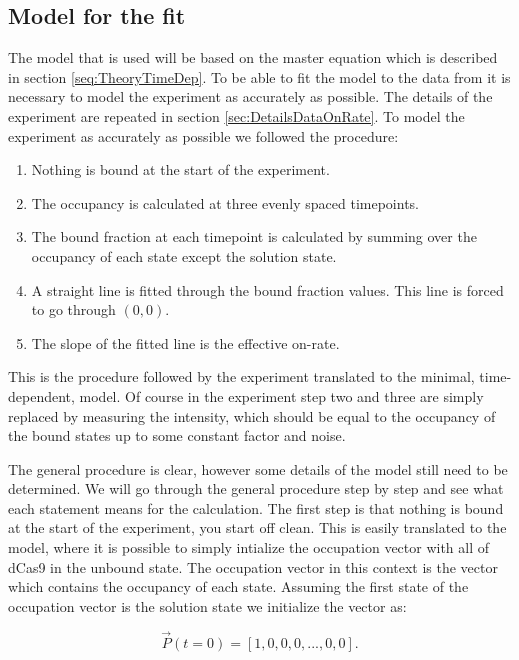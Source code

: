 \subsection{Model for the fit}
The model that is used will be based on the master equation which is described in section \ref{seq:TheoryTimeDep}. To be able to fit the model to the data from \cite{PNAS} it is necessary to model the experiment as accurately as possible. The details of the experiment are repeated in section \ref{sec:DetailsDataOnRate}. To model the experiment as accurately as possible we followed the procedure:

\begin{enumerate}
\item Nothing is bound at the start of the experiment.
\item The occupancy is calculated at three evenly spaced timepoints.
\item The bound fraction at each timepoint is calculated by summing over the occupancy of each state except the solution state.
\item A straight line is fitted through the bound fraction values. This line is forced to go through $(0,0)$.
\item The slope of the fitted line is the effective on-rate.
\end{enumerate}

This is the procedure followed by the experiment translated to the minimal, time-dependent, model. Of course in the experiment step two and three are simply replaced by measuring the intensity, which should be equal to the occupancy of the bound states up to some constant factor and noise.

The general procedure is clear, however some details of the model still need to be determined. We will go through the general procedure step by step and see what each statement means for the calculation. The first step is that nothing is bound at the start of the experiment, you start off clean. This is easily translated to the model, where it is possible to simply intialize the occupation vector with all of dCas9 in the unbound state. The occupation vector in this context is the vector which contains the occupancy of each state. Assuming the first state of the occupation vector is the solution state we initialize the vector as:

\begin{equation}
\vec{P}(t=0) = \left[ 1, 0, 0, 0, ..., 0, 0 \right].
\end{equation}

